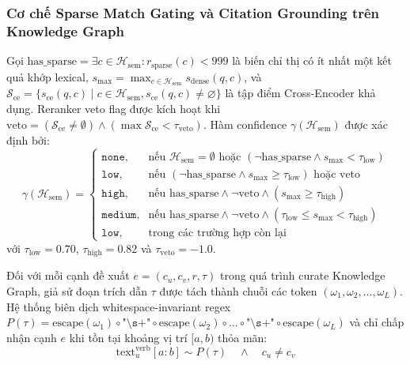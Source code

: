 \subsubsection{Cơ chế Sparse Match Gating và Citation Grounding trên Knowledge Graph}
Gọi $\text{has\_sparse} = \exists c \in \mathcal{H}_{\text{sem}} : r_{\text{sparse}}(c) < 999$ là biến chỉ thị có ít nhất một kết quả khớp lexical, $s_{\max} = \max_{c \in \mathcal{H}_{\text{sem}}} s_{\text{dense}}(q, c)$, và $\mathcal{S}_{\text{ce}} = \{s_{\text{ce}}(q, c) \mid c \in \mathcal{H}_{\text{sem}}, s_{\text{ce}}(q, c) \neq \varnothing\}$ là tập điểm Cross-Encoder khả dụng. Reranker veto flag được kích hoạt khi $\text{veto} = (\mathcal{S}_{\text{ce}} \neq \emptyset) \land (\max \mathcal{S}_{\text{ce}} < \tau_{\text{veto}})$. Hàm confidence $\gamma(\mathcal{H}_{\text{sem}})$ được xác định bởi:
\begin{equation}
    \gamma(\mathcal{H}_{\text{sem}}) = \begin{cases}
        \texttt{none}, & \text{nếu } \mathcal{H}_{\text{sem}} = \emptyset \text{ hoặc } (\neg \text{has\_sparse} \land s_{\max} < \tau_{\text{low}}) \\
        \texttt{low}, & \text{nếu } (\neg \text{has\_sparse} \land s_{\max} \ge \tau_{\text{low}}) \text{ hoặc } \text{veto} \\
        \texttt{high}, & \text{nếu } \text{has\_sparse} \land \neg \text{veto} \land (s_{\max} \ge \tau_{\text{high}}) \\
        \texttt{medium}, & \text{nếu } \text{has\_sparse} \land \neg \text{veto} \land (\tau_{\text{low}} \le s_{\max} < \tau_{\text{high}}) \\
        \texttt{low}, & \text{trong các trường hợp còn lại}
    \end{cases}
    \label{eq:confidence}
\end{equation}
với $\tau_{\text{low}} = 0.70$, $\tau_{\text{high}} = 0.82$ và $\tau_{\text{veto}} = -1.0$.

Đối với mỗi cạnh đề xuất $e = (c_u, c_v, r, \tau)$ trong quá trình curate Knowledge Graph, giả sử đoạn trích dẫn $\tau$ được tách thành chuỗi các token $(\omega_1, \omega_2, \dots, \omega_L)$. Hệ thống biên dịch whitespace-invariant regex $P(\tau) = \text{escape}(\omega_1) \circ \texttt{"\textbackslash s+"} \circ \text{escape}(\omega_2) \circ \dots \circ \texttt{"\textbackslash s+"} \circ \text{escape}(\omega_L)$ và chỉ chấp nhận cạnh $e$ khi tồn tại khoảng vị trí $[a, b)$ thỏa mãn:
\begin{equation}
    \text{text}^{\text{verb}}_u[a:b] \sim P(\tau) \quad \land \quad c_u \neq c_v
    \label{eq:citation_grounding}
\end{equation}

